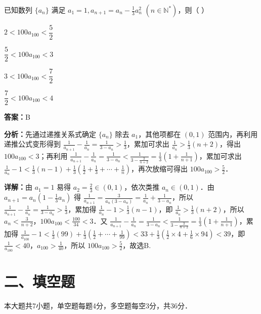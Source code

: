 \begin{question}[points=4]
已知数列 $\{a_n\}$ 满足 $a_1 = 1, a_{n+1} = a_n - \frac{1}{3}a_n^2$ $(n \in \mathbb{N}^*)$，则（ ）
\begin{choices}
  \item $2 < 100a_{100} < \dfrac{5}{2}$
  \item $\dfrac{5}{2} < 100a_{100} < 3$
  \item $3 < 100a_{100} < \dfrac{7}{2}$
  \item $\dfrac{7}{2} < 100a_{100} < 4$
\end{choices}
\begin{solution}
\textbf{答案：}B

\textbf{分析：}先通过递推关系式确定 $\{a_n\}$ 除去 $a_1$，其他项都在 $(0,1)$ 范围内，再利用递推公式变形得到 $\frac{1}{a_{n+1}} - \frac{1}{a_n} = \frac{1}{3-a_n} > \frac{1}{3}$，累加可求出 $\frac{1}{a_n} > \frac{1}{3}(n+2)$，得出 $100a_{100} < 3$；再利用 $\frac{1}{a_{n+1}} - \frac{1}{a_n} = \frac{1}{3-a_n} < \frac{1}{3-\frac{3}{n+2}} = \frac{1}{3}\left(1+\frac{1}{n+1}\right)$，累加可求出 $\frac{1}{a_n} - 1 < \frac{1}{3}(n-1) + \frac{1}{3}\left(\frac{1}{2}+\frac{1}{3}+\cdots+\frac{1}{n}\right)$，再次放缩可得出 $100a_{100} > \frac{5}{2}$．

\textbf{详解：}由 $a_1=1$ 易得 $a_2=\frac{2}{3} \in (0,1)$，依次类推 $a_n \in (0,1)$．由 $a_{n+1}=a_n\left(1-\frac{1}{3}a_n\right)$ 得 $\frac{1}{a_{n+1}} = \frac{3}{a_n(3-a_n)} = \frac{1}{a_n} + \frac{1}{3-a_n}$，所以 $\frac{1}{a_{n+1}} - \frac{1}{a_n} = \frac{1}{3-a_n} > \frac{1}{3}$，累加得 $\frac{1}{a_n} - 1 > \frac{1}{3}(n-1)$，即 $\frac{1}{a_n} > \frac{1}{3}(n+2)$，所以 $a_n < \frac{3}{n+2}$，$100a_{100} < \frac{100}{34} < 3$．又 $\frac{1}{a_{n+1}} - \frac{1}{a_n} = \frac{1}{3-a_n} < \frac{1}{3-\frac{3}{n+2}} = \frac{1}{3}\left(1+\frac{1}{n+1}\right)$，累加得 $\frac{1}{a_{100}} - 1 < \frac{1}{3}(99) + \frac{1}{3}\left(\frac{1}{2}+\cdots+\frac{1}{99}\right) < 33 + \frac{1}{3}\left(\frac{1}{2}\times4 + \frac{1}{6}\times94\right) < 39$，即 $\frac{1}{a_{100}} < 40$，$a_{100} > \frac{1}{40}$，所以 $100a_{100} > \frac{5}{2}$，故选B.
\end{solution}
\end{question}

\section*{二、填空题}
本大题共7小题，单空题每题4分，多空题每空3分，共36分．

